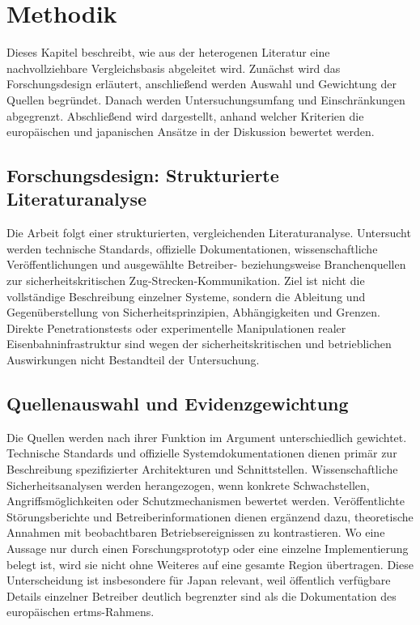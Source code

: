 \documentclass[runningheads]{res/llncs}
\begin{document}
\section{Methodik}
\label{sec:Methodik}

Dieses Kapitel beschreibt, wie aus der heterogenen Literatur eine nachvollziehbare Vergleichsbasis abgeleitet wird. Zunächst wird das Forschungsdesign erläutert, anschließend werden Auswahl und Gewichtung der Quellen begründet. Danach werden Untersuchungsumfang und Einschränkungen abgegrenzt. Abschließend wird dargestellt, anhand welcher Kriterien die europäischen und japanischen Ansätze in der Diskussion bewertet werden.

\subsection{Forschungsdesign: Strukturierte Literaturanalyse}
\label{sec:Forschungsdesign_Strukturierte_Literaturanalyse}

Die Arbeit folgt einer strukturierten, vergleichenden Literaturanalyse. Untersucht werden technische Standards, offizielle Dokumentationen, wissenschaftliche Veröffentlichungen und ausgewählte Betreiber- beziehungsweise Branchenquellen zur sicherheitskritischen Zug-Strecken-Kommunikation. Ziel ist nicht die vollständige Beschreibung einzelner Systeme, sondern die Ableitung und Gegenüberstellung von Sicherheitsprinzipien, Abhängigkeiten und Grenzen. Direkte Penetrationstests oder experimentelle Manipulationen realer Eisenbahninfrastruktur sind wegen der sicherheitskritischen und betrieblichen Auswirkungen nicht Bestandteil der Untersuchung.

\subsection{Quellenauswahl und Evidenzgewichtung}
\label{sec:Quellenauswahl_und_Evidenzgewichtung}

Die Quellen werden nach ihrer Funktion im Argument unterschiedlich gewichtet. Technische Standards und offizielle Systemdokumentationen dienen primär zur Beschreibung spezifizierter Architekturen und Schnittstellen. Wissenschaftliche Sicherheitsanalysen werden herangezogen, wenn konkrete Schwachstellen, Angriffsmöglichkeiten oder Schutzmechanismen bewertet werden. Veröffentlichte Störungsberichte und Betreiberinformationen dienen ergänzend dazu, theoretische Annahmen mit beobachtbaren Betriebsereignissen zu kontrastieren. Wo eine Aussage nur durch einen Forschungsprototyp oder eine einzelne Implementierung belegt ist, wird sie nicht ohne Weiteres auf eine gesamte Region übertragen. Diese Unterscheidung ist insbesondere für Japan relevant, weil öffentlich verfügbare Details einzelner Betreiber deutlich begrenzter sind als die Dokumentation des europäischen \gls{ertms}-Rahmens.
\end{document}
